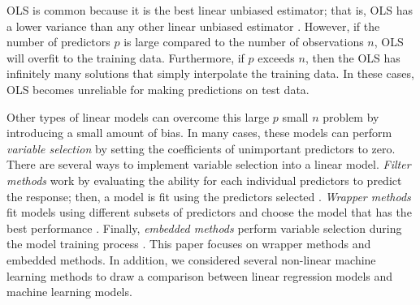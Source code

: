 \documentclass{article}
\begin{document}

	
	OLS is common because it is the best linear unbiased estimator; that is, OLS has a lower variance than any other linear unbiased estimator \cite{greene2003econometric, friedman2001elements}. However, if the number of predictors $p$ is large compared to the number of observations $n$, OLS will overfit to the training data. Furthermore, if $p$ exceeds $n$, then the OLS has infinitely many solutions that simply interpolate the training data. In these cases, OLS becomes unreliable for making predictions on test data.
	
	Other types of linear models can overcome this large $p$ small $n$ problem by introducing a small amount of bias. In many cases, these models can perform \textit{variable selection} by setting the coefficients of unimportant predictors to zero. There are several ways to implement variable selection into a linear model. \textit{Filter methods} work by evaluating the ability for each individual predictors to predict the response; then, a model is fit using the predictors selected \cite{sanchez2007filter, ding2005minimum}. \textit{Wrapper methods} fit models using different subsets of predictors and choose the model that has the best performance \cite{guyon2003introduction, liu2020logsum}. Finally, \textit{embedded methods} perform variable selection during the model training process \cite{guyon2003introduction, liu2020logsum}. This paper focuses on wrapper methods and embedded methods. In addition, we considered several non-linear machine learning methods to draw a comparison between linear regression models and machine learning models.
	
\end{document}
